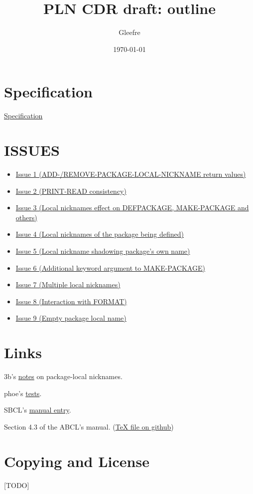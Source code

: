 \documentclass[11pt]{article}
\author{Gleefre}
\date{\today}
\title{PLN CDR draft: outline}
\begin{document}

\section{Specification}
\label{sec:orgad0148e}
\href{./spec.pdf}{Specification}
\section{ISSUES}
\label{sec:org8d1aa0d}
\begin{itemize}
\item \href{./issues/1.pdf}{Issue 1 (ADD-/REMOVE-PACKAGE-LOCAL-NICKNAME return values)}
\item \href{./issues/2.pdf}{Issue 2 (PRINT-READ consistency)}
\item \href{./issues/3.pdf}{Issue 3 (Local nicknames effect on DEFPACKAGE, MAKE-PACKAGE and others)}
\item \href{./issues/4.pdf}{Issue 4 (Local nicknames of the package being defined)}
\item \href{./issues/5.pdf}{Issue 5 (Local nickname shadowing package's own name)}
\item \href{./issues/6.pdf}{Issue 6 (Additional keyword argument to MAKE-PACKAGE)}
\item \href{./issues/7.pdf}{Issue 7 (Multiple local nicknames)}
\item \href{./issues/8.pdf}{Issue 8 (Interaction with FORMAT)}
\item \href{./issues/9.pdf}{Issue 9 (Empty package local name)}
\end{itemize}
\section{Links}
\label{sec:orgf749d11}
3b's \href{https://github.com/3b/package-local-nicknames/blob/master/docs.org}{notes} on package-local nicknames.

phoe's \href{https://github.com/phoe/trivial-package-local-nicknames}{tests}.

SBCL's \href{https://www.sbcl.org/manual/\#Package\_002dLocal-Nicknames}{manual entry}.

Section 4.3 of the ABCL's manual. (\href{https://github.com/armedbear/abcl/blob/master/doc/manual/abcl.tex\#L1249}{\TeX{} file on github})
\section{Copying and License}
\label{sec:orgd8b07d3}
[TODO]
\end{document}
